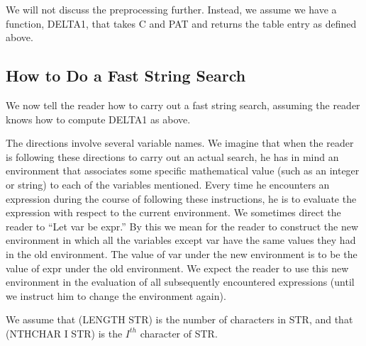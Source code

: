 \documentclass[11pt]{book}
\newcommand{\pubdefaulttextsize}{\large}
\begin{document}
We will not discuss the preprocessing
further.  Instead, we  assume we have a function, DELTA1, that
takes C and PAT and returns the table entry as defined above.
\subsection{How to Do a Fast String Search}
\label{SSSENGLISHFSTRPOS}
\pubdefaulttextsize
We now tell the reader how to carry
out a fast string search, assuming the reader knows how to compute
DELTA1 as above.

The directions  involve several variable names.
We imagine that when the reader is following these directions to
carry out an actual search, he has in mind an environment
that associates some specific mathematical
value (such as an integer or string) to each of the variables
mentioned.  Every time he encounters an expression during the course
of following these instructions, he is to evaluate the expression with
respect to the current environment.   We sometimes direct the reader
to  ``Let var be expr.''  By this we mean for the reader
to construct the new environment in which all the variables
except var have the same values they had in the old environment.
The value of var under the new environment is to be the
value of expr under the old environment.  We expect
the reader to use this new environment in the evaluation of all subsequently
encountered expressions  (until we instruct him to change the environment again).

We  assume that (LENGTH STR) is the number of characters in
STR, and that (NTHCHAR I STR) is the $I^{th}$ character of STR.
\end{document}
